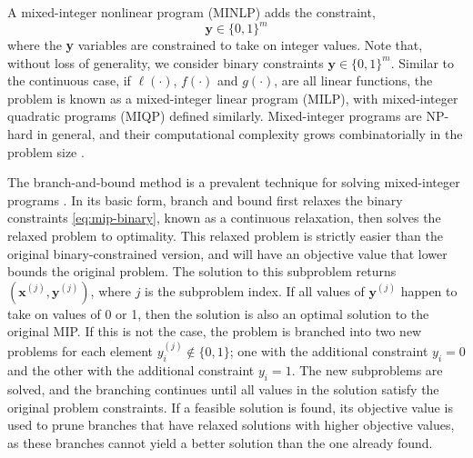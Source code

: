 A mixed-integer nonlinear program (MINLP) adds the constraint,
\begin{equation}
     \textbf{y}\in\{0, 1\}^m
     \label{eq:mip-binary}
\end{equation}
where the \textbf{y} variables are constrained to take on integer values. Note that, without loss of generality, we consider binary constraints $\textbf{y} \in \{0, 1\}^m$. Similar to the continuous case, if $\ell(\cdot)$, $f(\cdot)$ and $g(\cdot)$, are all linear functions, the problem is known as a mixed-integer linear program (MILP), with mixed-integer quadratic programs (MIQP) defined similarly. Mixed-integer programs are NP-hard in general, and their computational complexity grows combinatorially in the problem size \cite{yuan2016binary}.

The branch-and-bound method is a prevalent technique for solving mixed-integer programs \cite{land_automatic_1960}. In its basic form, branch and bound first relaxes the binary constraints \eqref{eq:mip-binary}, known as a continuous relaxation, then solves the relaxed problem to optimality.
This relaxed problem is strictly easier than the original binary-constrained version, and will have an objective value that lower bounds the original problem. The solution to this subproblem returns $(\textbf{x}^{(j)}, \textbf{y}^{(j)})$, where $j$ is the subproblem index. If all values of $\textbf{y}^{(j)}$ happen to take on values of 0 or 1, then the solution is also an optimal solution to the original MIP. If this is not the case, the problem is branched into two new problems for each element $y^{(j)}_i \notin \{0, 1\}$; one with the additional constraint $y_i=0$ and the other with the additional constraint $y_i=1$. The new subproblems are solved, and the branching continues until all values in the solution satisfy the original problem constraints. If a feasible solution is found, its objective value is used to prune branches that have relaxed solutions with higher objective values, as these branches cannot yield a better solution than the one already found. 

